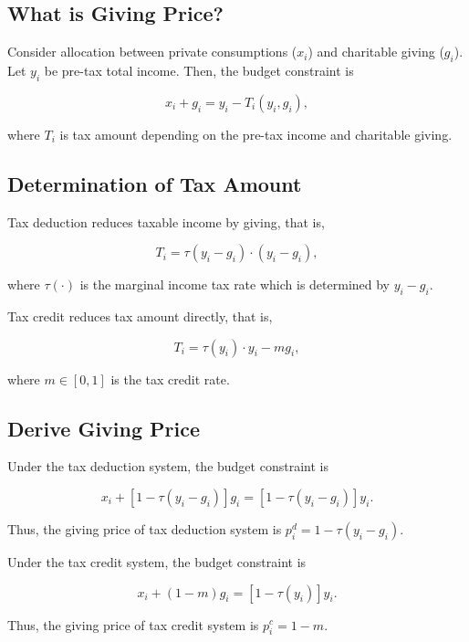\documentclass[ review  , 3p ]{elsarticle}
\begin{document}
  \hypertarget{what-is-giving-price}{%
  \subsection{What is Giving Price?}\label{what-is-giving-price}}
  
  Consider allocation between private consumptions (\(x_i\)) and charitable giving (\(g_i\)).
  Let \(y_i\) be pre-tax total income.
  Then, the budget constraint is
  
  \[
      x_i + g_i = y_i - T_i(y_i, g_i),
  \]
  
  where \(T_i\) is tax amount depending on the pre-tax income and charitable giving.
  
  \hypertarget{determination-of-tax-amount}{%
  \subsection{Determination of Tax Amount}\label{determination-of-tax-amount}}
  
  Tax deduction reduces taxable income by giving, that is,
  
  \[
      T_i = \tau(y_i - g_i) \cdot (y_i - g_i),
  \]
  
  where \(\tau(\cdot)\) is the marginal income tax rate which is determined by \(y_i - g_i\).
  
  Tax credit reduces tax amount directly, that is,
  
  \[
      T_i = \tau(y_i)\cdot y_i - m g_i,
  \]
  
  where \(m \in [0, 1]\) is the tax credit rate.
  
  \hypertarget{derive-giving-price}{%
  \subsection{Derive Giving Price}\label{derive-giving-price}}
  
  Under the tax deduction system, the budget constraint is
  
  \[
      x_i + [1 - \tau(y_i - g_i)]g_i = [1 - \tau(y_i - g_i)] y_i.
  \]
  
  Thus, the giving price of tax deduction system is \(p_i^{d} = 1 - \tau(y_i - g_i)\).
  
  Under the tax credit system, the budget constraint is
  
  \[
      x_i + (1 - m) g_i = [1 - \tau(y_i)] y_i.
  \]
  
  Thus, the giving price of tax credit system is \(p_i^c = 1 - m\).
  
\end{document}
